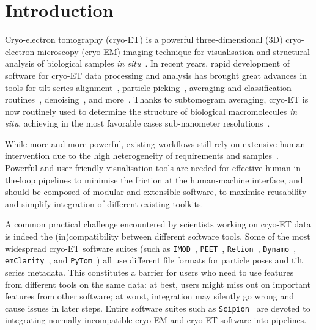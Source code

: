 \section{Introduction}

Cryo-electron tomography (cryo-ET) is a powerful three-dimensional (3D) cryo-electron microscopy (cryo-EM) imaging technique for visualisation and structural analysis of biological samples \emph{in situ}~\cite{turkPromiseChallengesCryoelectron2020}. In recent years, rapid development of software for cryo-ET data processing and analysis has brought great advances in tools for tilt series alignment~\cite{zhengAreTomoIntegratedSoftware2022}, particle picking~\cite{riceTomoTwinGeneralized3D2023,wagnerSPHIREcrYOLOFastAccurate2019}, averaging and classification routines~\cite{zivanovBayesianApproachSingleparticle2022,tegunovRealtimeCryoelectronMicroscopy2019,tegunovMultiparticleCryoEMRefinement2021}, denoising~\cite{beplerTopazDenoiseGeneralDeep2020,buchholzCryoCAREContentAwareImage2019}, and more~\cite{galaz-montoyaSingleParticleTomography2015}. Thanks to subtomogram averaging, cryo-ET is now routinely used to determine the structure of biological macromolecules \emph{in situ}, achieving in the most favorable cases sub-nanometer resolutions~\cite{schurHighresolutionSituStructural2019,turonovaEfficient3DCTFCorrection2017}.

While more and more powerful, existing workflows still rely on extensive human intervention due to the high heterogeneity of requirements and samples~\cite{burtFlexibleFrameworkMultiparticle2021,scaramuzzaStepbystepGuideEfficient2021}. Powerful and user-friendly visualisation tools are needed for effective human-in-the-loop pipelines to minimise the friction at the human-machine interface, and should be composed of modular and extensible software, to maximise reusability and simplify integration of different existing toolkits.

A common practical challenge encountered by scientists working on cryo-ET data is indeed the (in)compatibility between different software tools. Some of the most widespread cryo-ET software suites (such as \texttt{IMOD}~\cite{kremerComputerVisualizationThreeDimensional1996}, \texttt{PEET}~\cite{nicastroMolecularArchitectureAxonemes2006,heumannClusteringVarianceMaps2011}, \texttt{Relion}~\cite{scheresRELIONImplementationBayesian2012}, \texttt{Dynamo}~\cite{castano-diezDynamoFlexibleUserfriendly2012}, \texttt{emClarity}~\cite{himesEmClaritySoftwareHighresolution2018}, and \texttt{PyTom}~\cite{hrabePyTomPythonbasedToolbox2012,chailletExtensiveAngularSampling2023}) all use different file formats for particle poses and tilt series metadata. This constitutes a barrier for users who need to use features from different tools on the same data: at best, users might miss out on important features from other software; at worst, integration may silently go wrong and cause issues in later steps. Entire software suites such as \texttt{Scipion}~\cite{delarosa-trevinScipionSoftwareFramework2016} are devoted to integrating normally incompatible cryo-EM and cryo-ET software into pipelines.

